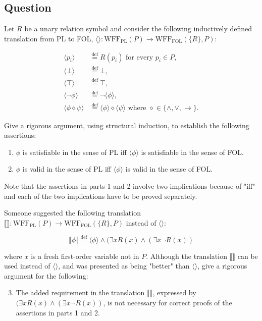 \documentclass{article}
\begin{document}
\begin{mdframed}
    \subsection*{Question}

    Let $R$ be a unary relation symbol and consider the following inductively defined translation from PL to FOL, $\langle \rangle : \text{WFF}_\text{PL}(P) \rightarrow \text{WFF}_\text{FOL}(\{R\}, P)$:
    
    \begin{align*}
    \langle p_i \rangle &\overset{\text{def}}{=} R(p_i) \text{ for every } p_i \in P, \\
    \langle \bot \rangle &\overset{\text{def}}{=} \bot, \\
    \langle \top \rangle &\overset{\text{def}}{=} \top, \\
    \langle \neg\phi \rangle &\overset{\text{def}}{=} \neg\langle\phi\rangle, \\
    \langle \phi \diamond \psi \rangle &\overset{\text{def}}{=} \langle\phi\rangle \diamond \langle\psi\rangle \text{ where } \diamond \in \{\wedge, \vee, \rightarrow\}.
    \end{align*}
    
    Give a rigorous argument, using structural induction, to establish the following assertions:
    
    \begin{enumerate}
    \item $\phi$ is satisfiable in the sense of PL iff $\langle\phi\rangle$ is satisfiable in the sense of FOL.
    \item $\phi$ is valid in the sense of PL iff $\langle\phi\rangle$ is valid in the sense of FOL.
    \end{enumerate}
    
    Note that the assertions in parts 1 and 2 involve two implications because of "iff" and each of the two implications have to be proved separately.
    
    Someone suggested the following translation
    $\llbracket \rrbracket : \text{WFF}_\text{PL}(P) \rightarrow \text{WFF}_\text{FOL}(\{R\}, P)$ instead of $\langle \rangle$:
    
    \[
    \llbracket\phi\rrbracket \overset{\text{def}}{=} \langle\phi\rangle \wedge (\exists x R(x) \wedge (\exists x \neg R(x))
    \]
    
    where $x$ is a fresh first-order variable not in $P$. Although the translation $\llbracket \rrbracket$ can be used instead of $\langle \rangle$, and was presented as being "better" than $\langle \rangle$, give a rigorous argument for the following:
    
    \begin{enumerate}
    \setcounter{enumi}{2}
    \item The added requirement in the translation $\llbracket \rrbracket$, expressed by $(\exists x R(x) \wedge (\exists x \neg R(x))$, is not necessary for correct proofs of the assertions in parts 1 and 2.
    \end{enumerate}
\end{mdframed}
\end{document}
